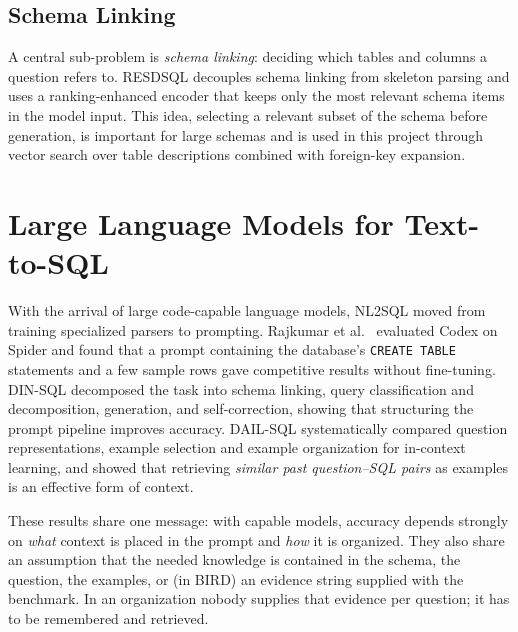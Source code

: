 \subsection{Schema Linking}
A central sub-problem is \textit{schema linking}: deciding which tables and columns a
question refers to. RESDSQL \cite{li2023resdsql} decouples schema linking from skeleton
parsing and uses a ranking-enhanced encoder that keeps only the most relevant schema items
in the model input. This idea, selecting a relevant subset of the schema before
generation, is important for large schemas and is used in this project through vector
search over table descriptions combined with foreign-key expansion.

\section{Large Language Models for Text-to-SQL}
With the arrival of large code-capable language models, NL2SQL moved from training
specialized parsers to prompting. Rajkumar et al.\ \cite{rajkumar2022evaluating} evaluated
Codex on Spider and found that a prompt containing the database's \texttt{CREATE TABLE}
statements and a few sample rows gave competitive results without fine-tuning. DIN-SQL
\cite{pourreza2023dinsql} decomposed the task into schema linking, query classification and
decomposition, generation, and self-correction, showing that structuring the prompt
pipeline improves accuracy. DAIL-SQL \cite{gao2023dailsql} systematically compared question
representations, example selection and example organization for in-context learning, and
showed that retrieving \textit{similar past question--SQL pairs} as examples is an effective
form of context.

These results share one message: with capable models, accuracy depends strongly on
\textit{what} context is placed in the prompt and \textit{how} it is organized. They also
share an assumption that the needed knowledge is contained in the schema, the question, the
examples, or (in BIRD) an evidence string supplied with the benchmark. In an organization
nobody supplies that evidence per question; it has to be remembered and retrieved.


